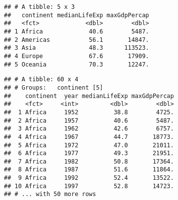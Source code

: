 \documentclass[
]{article}
\newenvironment{Shaded}{\begin{snugshade}}{\end{snugshade}}
\newcommand{\CommentTok}[1]{\textcolor[rgb]{0.56,0.35,0.01}{\textit{#1}}}
\newcommand{\DataTypeTok}[1]{\textcolor[rgb]{0.13,0.29,0.53}{#1}}
\newcommand{\DecValTok}[1]{\textcolor[rgb]{0.00,0.00,0.81}{#1}}
\newcommand{\KeywordTok}[1]{\textcolor[rgb]{0.13,0.29,0.53}{\textbf{#1}}}
\newcommand{\NormalTok}[1]{#1}
\newcommand{\OperatorTok}[1]{\textcolor[rgb]{0.81,0.36,0.00}{\textbf{#1}}}
\newcommand{\StringTok}[1]{\textcolor[rgb]{0.31,0.60,0.02}{#1}}
\begin{document}
\begin{Shaded}
\end{Shaded}

\begin{verbatim}
## # A tibble: 5 x 3
##   continent medianLifeExp maxGdpPercap
##   <fct>             <dbl>        <dbl>
## 1 Africa             40.6        5487.
## 2 Americas           56.1       14847.
## 3 Asia               48.3      113523.
## 4 Europe             67.6       17909.
## 5 Oceania            70.3       12247.
\end{verbatim}

\begin{Shaded}
\end{Shaded}

\begin{verbatim}
## # A tibble: 60 x 4
## # Groups:   continent [5]
##    continent  year medianLifeExp maxGdpPercap
##    <fct>     <int>         <dbl>        <dbl>
##  1 Africa     1952          38.8        4725.
##  2 Africa     1957          40.6        5487.
##  3 Africa     1962          42.6        6757.
##  4 Africa     1967          44.7       18773.
##  5 Africa     1972          47.0       21011.
##  6 Africa     1977          49.3       21951.
##  7 Africa     1982          50.8       17364.
##  8 Africa     1987          51.6       11864.
##  9 Africa     1992          52.4       13522.
## 10 Africa     1997          52.8       14723.
## # ... with 50 more rows
\end{verbatim}
\end{document}

